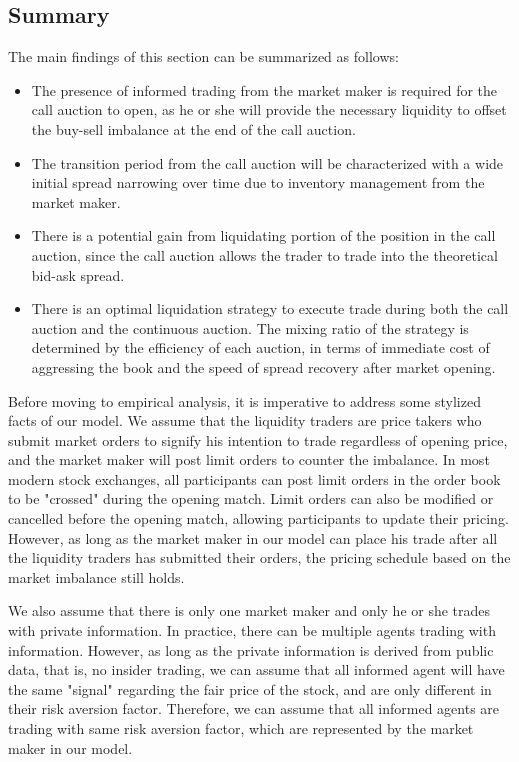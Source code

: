 \documentclass{article}
\begin{document}
\subsection{Summary}

The main findings of this section can be summarized as follows:

\begin{itemize}
  \item The presence of informed trading from the market maker is required for the call auction to open, as he or she will provide the necessary liquidity to offset the buy-sell imbalance at the end of the call auction.
  \item The transition period from the call auction will be characterized with a wide initial spread narrowing over time due to inventory management from the market maker.
  \item There is a potential gain from liquidating portion of the position in the call auction, since the call auction allows the trader to trade into the theoretical bid-ask spread.
  \item There is an optimal liquidation strategy to execute trade during both the call auction and the continuous auction. The mixing ratio of the strategy is determined by the efficiency of each auction, in terms of immediate cost of aggressing the book and the speed of spread recovery after market opening.
\end{itemize}

Before moving to empirical analysis, it is imperative to address some stylized facts of our model. We assume that the liquidity traders are price takers who submit market orders to signify his intention to trade regardless of opening price, and the market maker will post limit orders to counter the imbalance. In most modern stock exchanges, all participants can post limit orders in the order book to be "crossed" during the opening match. Limit orders can also be modified or cancelled before the opening match, allowing participants to update their pricing. However, as long as the market maker in our model can place his trade after all the liquidity traders has submitted their orders, the pricing schedule based on the market imbalance still holds.

We also assume that there is only one market maker and only he or she trades with private information. In practice, there can be multiple agents trading with information. However, as long as the private information is derived from public data, that is, no insider trading, we can assume that all informed agent will have the same "signal" regarding the fair price of the stock, and are only different in their risk aversion factor. Therefore, we can assume that all informed agents are trading with same risk aversion factor, which are represented by the market maker in our model.
\end{document}
